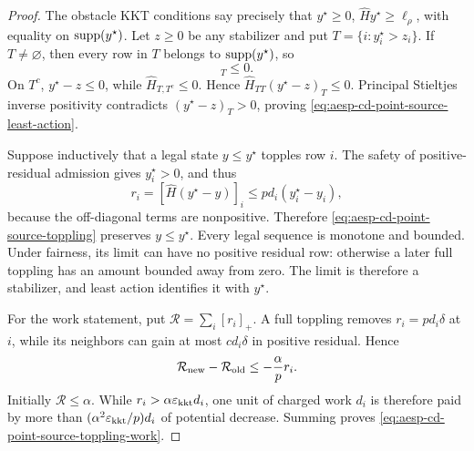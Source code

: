 \begin{proof}
The obstacle KKT conditions say precisely that \(y^\star\geq0\),
\(\widehat Hy^\star\geq\ell_\rho\), with equality on
\(\operatorname{supp}(y^\star)\).  Let \(z\geq0\) be any stabilizer and put
\(T=\{i:y_i^\star>z_i\}\).  If \(T\neq\varnothing\), then every row in
\(T\) belongs to \(\operatorname{supp}(y^\star)\), so
\begin{equation*}
 [\widehat H(y^\star-z)]_T\leq0.
\end{equation*}
On \(T^c\), \(y^\star-z\leq0\), while
\(\widehat H_{T,T^c}\leq0\).  Hence
\(\widehat H_{TT}(y^\star-z)_T\leq0\).  Principal Stieltjes inverse
positivity contradicts \((y^\star-z)_T>0\), proving
\cref{eq:aesp-cd-point-source-least-action}.

Suppose inductively that a legal state \(y\leq y^\star\) topples row \(i\).
The safety of positive-residual admission gives \(y_i^\star>0\), and thus
\begin{equation*}
 r_i=[\widehat H(y^\star-y)]_i
 \leq p d_i(y_i^\star-y_i),
\end{equation*}
because the off-diagonal terms are nonpositive.  Therefore
\cref{eq:aesp-cd-point-source-toppling} preserves \(y\leq y^\star\).
Every legal sequence is monotone and bounded.  Under fairness, its limit can
have no positive residual row: otherwise a later full toppling has an amount
bounded away from zero.  The limit is therefore a stabilizer, and least
action identifies it with \(y^\star\).

For the work statement, put \(\mathcal R=\sum_i[r_i]_+\).  A full toppling
removes \(r_i=p d_i\delta\) at \(i\), while its neighbors can gain at most
\(c d_i\delta\) in positive residual.  Hence
\begin{equation*}
 \mathcal R_{\rm new}-\mathcal R_{\rm old}
 \leq-\frac{\alpha}{p}r_i.
\end{equation*}
Initially \(\mathcal R\leq\alpha\).  While
\(r_i>\alpha\varepsilon_{\mathrm{kkt}} d_i\), one unit of charged work \(d_i\) is therefore
paid by more than
\((\alpha^2\varepsilon_{\mathrm{kkt}}/p)d_i\) of potential decrease.  Summing proves
\cref{eq:aesp-cd-point-source-toppling-work}.
\end{proof}

